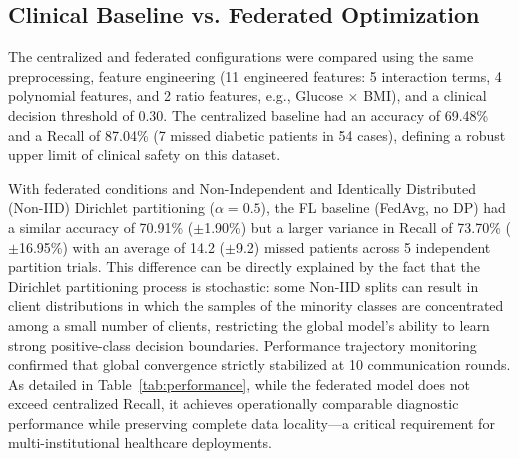\documentclass[conference]{IEEEtran}
\begin{document}
\subsection{Clinical Baseline vs. Federated Optimization}
The centralized and federated configurations were compared using the same preprocessing, feature engineering (11 engineered features: 5 interaction terms, 4 polynomial features, and 2 ratio features, e.g., Glucose \( \times \) BMI), and a clinical decision threshold of 0.30. The centralized baseline had an accuracy of 69.48\% and a Recall of 87.04\% (7 missed diabetic patients in 54 cases), defining a robust upper limit of clinical safety on this dataset.

With federated conditions and Non-Independent and Identically Distributed (Non-IID) Dirichlet partitioning (\( \alpha = 0.5 \)), the FL baseline (FedAvg, no DP) had a similar accuracy of 70.91\% (\( \pm \)1.90\%) but a larger variance in Recall of 73.70\% (\( \pm \)16.95\%) with an average of 14.2 (\( \pm \)9.2) missed patients across 5 independent partition trials. This difference can be directly explained by the fact that the Dirichlet partitioning process is stochastic: some Non-IID splits can result in client distributions in which the samples of the minority classes are concentrated among a small number of clients, restricting the global model's ability to learn strong positive-class decision boundaries. Performance trajectory monitoring confirmed that global convergence strictly stabilized at 10 communication rounds. As detailed in Table~\ref{tab:performance}, while the federated model does not exceed centralized Recall, it achieves operationally comparable diagnostic performance while preserving complete data locality---a critical requirement for multi-institutional healthcare deployments.
\end{document}
